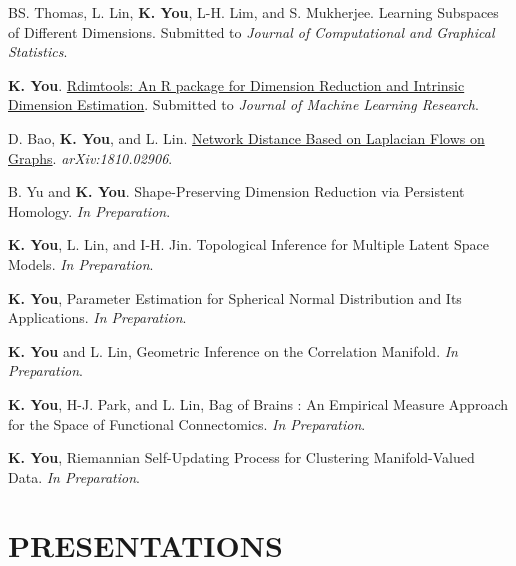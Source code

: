 \documentclass[margin, 10pt]{res} %
\begin{document}
\begin{resume}
\begin{enumerate}[label={[\roman*]}] 
	\item BS. Thomas, L. Lin, \textbf{K. You}, L-H. Lim, and S. Mukherjee. Learning Subspaces of Different Dimensions. Submitted to \textit{Journal of Computational and Graphical Statistics}.
	\item \textbf{K. You}. \href{https://arxiv.org/abs/2005.11107}{Rdimtools: An R package for Dimension Reduction and Intrinsic Dimension Estimation}. Submitted to \textit{Journal of Machine Learning Research}.
	\item D. Bao, \textbf{K. You}, and L. Lin. \href{https://arxiv.org/abs/1810.02906}{Network Distance Based on Laplacian Flows on Graphs}. {\it arXiv:1810.02906}.
	\item B. Yu and \textbf{K. You}. Shape-Preserving Dimension Reduction via Persistent Homology. \textit{In Preparation}.
	\item \textbf{K. You}, L. Lin, and I-H. Jin. Topological Inference for Multiple Latent Space Models. \textit{In Preparation}.
	\item \textbf{K. You}, Parameter Estimation for Spherical Normal Distribution and Its Applications. \textit{In Preparation}.
	\item \textbf{K. You} and L. Lin, Geometric Inference on the Correlation Manifold. \textit{In Preparation}.
	\item \textbf{K. You}, H-J. Park, and L. Lin, Bag of Brains : An Empirical Measure Approach for the Space of Functional Connectomics. \textit{In Preparation}.
	\item \textbf{K. You}, Riemannian Self-Updating Process for Clustering Manifold-Valued Data. \textit{In Preparation}.
\end{enumerate}
\vspace{.2cm}


\section{\sf PRESENTATIONS}


\end{resume}
\end{document}
